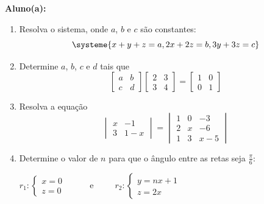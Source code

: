 \documentclass[a4paper,5pt]{amsbook}
\begin{document}
\vspace{0.5cm}
{\bf Aluno(a):}\dotfill{}  %

\vspace{0.2cm}
\begin{enumerate}
	\vspace{0.5cm}
	\item Resolva o sistema, onde $a$, $b$ e $c$ s\~ao constantes:
		\[\systeme{
				x+y+z=a,
				2x+2z=b,
				3y+3z=c}\]

	\vspace{0.5cm}
	\item Determine $a$, $b$, $c$ e $d$ tais que
		\[\begin{bmatrix}
			a & b \\
			c & d
		\end{bmatrix}
		\begin{bmatrix}
			2 & 3 \\
			3 & 4
		\end{bmatrix}
		=
		\begin{bmatrix}
			1 & 0 \\
			0 & 1
		\end{bmatrix}\]
	
	\vspace{0.5cm}
	\item Resolva a equa\c{c}\~ao
		\[\begin{vmatrix}
			x & -1 \\
			3 & 1-x
		\end{vmatrix}=
		\begin{vmatrix}
			1 & 0 & -3 \\
			2 & x & -6 \\
			1 & 3 & x-5
		\end{vmatrix}\]

	\vspace{0.5cm}
	\item Determine o valor de $n$ para que o \^angulo entre as retas seja
		$\frac{\pi}{6}$:

	$r_1:\left\{\begin{array}{l}
		x = 0 \\
		z = 0
	\end{array}\right.$
	\ \ \ \ \ e\ \ \ \ \ 
	$r_2:\left\{\begin{array}{l}
		y = nx + 1 \\
		z = 2x
	\end{array}\right.$


\end{enumerate}
\end{document}
